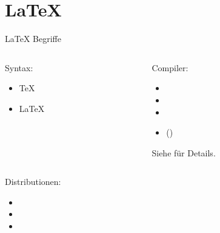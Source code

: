 \documentclass{setbeamer}
\begin{document}
\section{\LaTeX{}}
\begin{frame}{\LaTeX{} Begriffe}
    \pause
    \begin{columns}
        \begin{column}{0.5\textwidth}
            Syntax:
            \begin{itemize}
                \item \TeX{}
                \item \LaTeX{}
            \end{itemize}
        \end{column}

        \pause
        \begin{column}{0.5\textwidth}
            Compiler:
            \begin{itemize}
                \item {}
                \item {}
                \item {}
                \item ()
            \end{itemize}
            {\scriptsize Siehe  für Details.\par}
        \end{column}
    \end{columns}


    \pause
    \vspace{3mm}
    \begin{columns}
        \begin{column}{0.5\textwidth}
            Distributionen:
            \begin{itemize}
                \item {}
                \item {}
                \item {}
            \end{itemize}
        \end{column}


\end{columns}
\end{frame}
\end{document}
